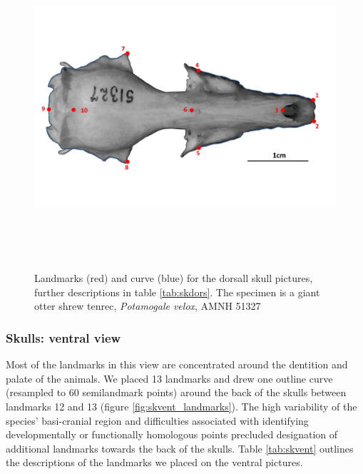 \documentclass[12pt,a4paper]{article}
\begin{document}
	\begin{figure}[!htb] 
 	\centering
  	\includegraphics[width=12cm, height=12cm, keepaspectratio=true]
  	{figures/AMNH_51327_dorsallandmarksdiagram.png}    
    \caption {Landmarks (red) and curve (blue) for the dorsall skull pictures, further descriptions in table \ref{tab:skdors}. The specimen is a giant otter shrew tenrec, \textit{Potamogale velox}, AMNH 51327}
  	\label{fig:skdors_landmarks}
  	\end{figure}

	\begin{table}[!htb]			
	\centering
	\caption{Descriptions of the landmarks (points) and curves (semilandmarks) for the skulls in dorsal view (see Figure \ref{fig:skdors_landmarks}).}
	 
	\label{tab:skdors}  
	\end{table}

\newpage
\subsubsection{Skulls: ventral view}
	Most of the landmarks in this view are concentrated around the dentition and palate of the animals. We placed 13 landmarks and drew one outline curve (resampled to 60 semilandmark points) around the back of the skulls between landmarks 12 and 13 (figure \ref{fig:skvent_landmarks}). The high variability of the species’ basi-cranial region and difficulties associated with identifying developmentally or functionally homologous points precluded designation of additional landmarks towards the back of the skulls. Table \ref{tab:skvent} outlines the descriptions of the landmarks we placed on the ventral pictures.
\end{document}
